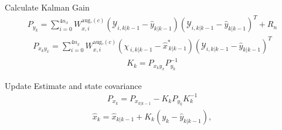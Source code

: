     \item Calculate Kalman Gain
    \begin{align*}
        P_{y_{k}} = \sum_{i=0}^{4n_{x}} W^{\text{aug,}(c)}_{x,i} (\mathcal{Y}_{i, k|k-1} - \hat{y}_{k|k-1})(\mathcal{Y}_{i, k|k-1} - \hat{y}_{k|k-1})^{T} + R_{n}   %
        \end{align*}
        \begin{align*}
        P_{x_{k}y_{x}} = \sum_{i=0}^{4n_{x}} W^{\text{aug,}(c)}_{x,i} (\chi_{\ i, k|k-1} - \hat{x}^{*}_{\ k|k-1})(\mathcal{Y}_{i, k|k-1} - \hat{y}_{k|k-1})^{T} 
        \end{align*}
        \begin{align*}
        K_{k} = P_{x_{k}y_{x}}P^{-1}_{y_{k}}
    \end{align*}
    \item Update Estimate and state covariance
   \begin{align*}
        P_{x_{k}} = P_{x_{k|k-1}} - K_{k}P_{y_{k}}K^{-1}_{k} 
   \end{align*}
    \begin{align*}
        \hat{x}_{k} = \hat{x}_{k|k-1} + K_{k}(y_{k}-\hat{y}_{k|k-1}),
    \end{align*}

